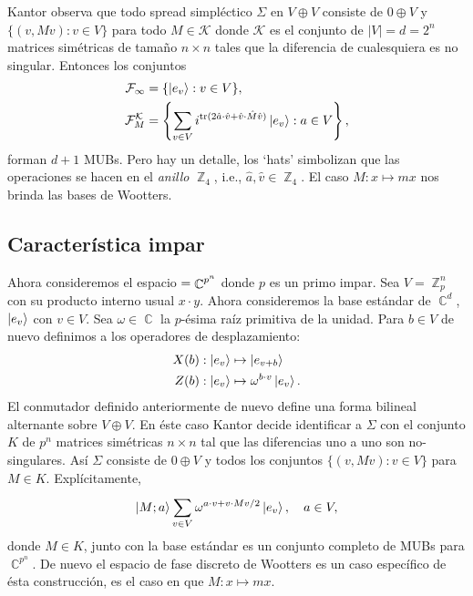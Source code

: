 \documentclass[a4paper]{report}
\DeclareMathOperator{\C}{\mathbb{C}}
\DeclareMathOperator{\Z}{\mathbb{Z}}
\let\H\relax
\DeclareMathOperator{\H}{\mathcal H}
\DeclareMathOperator{\tr}{tr}
\begin{document}
  Kantor observa que todo spread simpléctico $\Sigma$ en $V
  \oplus V$ consiste de $0 \oplus V$ y $\{(v, Mv) : v \in
  V\}$ para todo $M \in \mathcal K$ donde $\mathcal K$ es el
  conjunto de $|V| = d = 2^{n}$ matrices simétricas de
  tamaño $n \times n$ tales que la diferencia de
  cualesquiera es no singular. Entonces los conjuntos 
  \begin{align}
    \mathcal F_\infty &=
    \{\ket{e_v} : v \in V\}, \\
    \mathcal F_M^{\mathcal K} &=
    \left\{
      \sum_{v \in V}^{} i^{\tr(2 \hat a \cdot \hat v + \hat
      v \cdot \hat M \hat v)} \ket{e_v} : a \in V
    \right\},
  \end{align}
  forman $d + 1$ MUBs. Pero hay un detalle, los `hats'
  simbolizan que las operaciones se hacen en el
  \textit{anillo} $\Z_4$, i.e., $\hat a, \hat v \in \Z_4$.
  El caso $M : x \mapsto mx$ nos brinda las bases de
  Wootters.

  \subsection{Característica impar}

  Ahora consideremos el espacio $\H = \C^{p^{n}}$ donde $p$ 
  es un primo impar. Sea $V = \Z_p^{n}$ con su producto
  interno usual $x \cdot y$. Ahora consideremos la base
  estándar de $\C^{d}$,  $\ket{e_v}$ con $v \in V$. Sea
  $\omega \in \C$ la $p$-ésima raíz primitiva de la unidad.
  Para $b \in V$ de nuevo definimos a los operadores de
  desplazamiento:
  \begin{align}
    X(b) &: \ket{e_v} \mapsto \ket{e_{v+b}} \\
    Z(b) &: \ket{e_v} \mapsto \omega^{b \cdot v}
    \ket{e_v}.
  \end{align}
  El conmutador definido anteriormente de nuevo define una
  forma bilineal alternante sobre $V \oplus V$. En éste caso
  Kantor decide identificar a $\Sigma$ con el conjunto $K$ 
  de $p^{n}$ matrices simétricas $n \times n$ tal que las
  diferencias uno a uno son no-singulares. Así $\Sigma$ 
  consiste de $0 \oplus V$ y todos los conjuntos $\{(v,Mv) :
  v \in V\}$ para $M \in K$. Explícitamente, 
  \[
    \ket{M; a}
    \sum_{v \in V}^{} \omega^{a \cdot v + v \cdot Mv / 2}
    \ket{e_v}, 
    \quad a \in V,
  \] 
  donde $M \in K$, junto con la base estándar es un conjunto
  completo de MUBs para $\C^{p^{n}}$. De nuevo el espacio de
  fase discreto de Wootters es un caso específico de ésta
  construcción, es el caso en que $M : x \mapsto mx$. 
\end{document}

